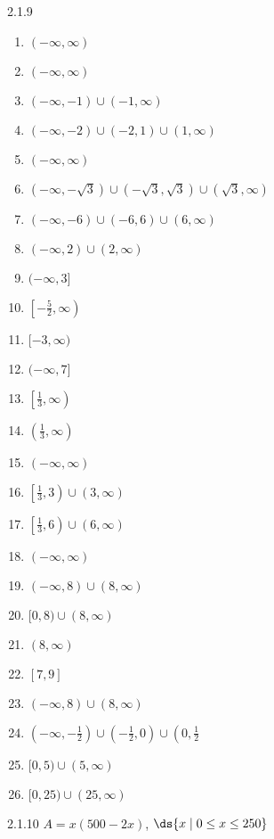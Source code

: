 \begin{Answer}{2.1.9}
\begin{multicols}{2}
	\begin{enumerate}
		\item $(-\infty, \infty)$
		\item  $(-\infty, \infty)$
		\item $(-\infty, -1) \cup (-1, \infty)$
		\item  $(-\infty,-2) \cup (-2,1) \cup (1, \infty)$
		\item $(-\infty, \infty)$
		\item  $(-\infty, -\sqrt{3}) \cup (-\sqrt{3}, \sqrt{3}) \cup (\sqrt{3}, \infty)$
		\item  $(-\infty, -6) \cup (-6,6) \cup (6, \infty)$
		\item $(-\infty, 2) \cup (2, \infty)$
		\item  $(-\infty, 3]$
		\item $\left[-\frac{5}{2}, \infty \right)$
		\item  $[-3, \infty)$
		\item $(-\infty, 7]$
		\item    $\left[ \frac{1}{3}, \infty \right)$
		\item   $\left( \frac{1}{3}, \infty \right)$
		\item   $(-\infty, \infty)$
		\item   $\left[ \frac{1}{3}, 3 \right) \cup (3, \infty)$
		\item  $\left[ \frac{1}{3}, 6 \right) \cup (6, \infty)$
		\item   $(-\infty, \infty)$
		\item $(-\infty, 8) \cup (8, \infty)$
		\item $[0, 8) \cup (8, \infty)$
		\item $(8, \infty)$
		\item $[7, 9]$
		\item $(-\infty, 8) \cup (8, \infty)$
		\item $\left( -\infty, -\frac{1}{2} \right) \cup \left( -\frac{1}{2}, 0 \right) \cup \left(0, \frac{1}{2}$
		\item $[0, 5) \cup (5,\infty)$
		\item $[0, 25) \cup (25, \infty)$
\end{enumerate}
\end{multicols}

\end{Answer}
\begin{Answer}{2.1.10}
$A=x(500-2x)$, $\ds \{x\mid 0\le x\le 250\}$
\end{Answer}
